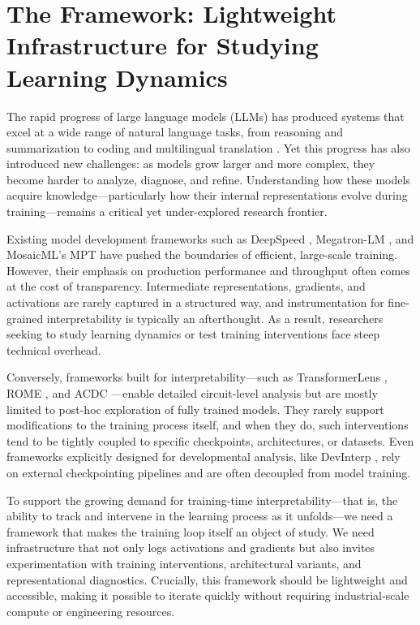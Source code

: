 \chapter{The \picosupabig Framework: Lightweight Infrastructure for Studying Learning Dynamics}
\label{sec:pico-intro}

The rapid progress of large language models (LLMs) has produced systems that excel at a wide range of natural language tasks, from reasoning and summarization to coding and multilingual translation \citep{hendrycks2021mmlu, cobbe2021gsm8k, srivastava2023bigbench}. Yet this progress has also introduced new challenges: as models grow larger and more complex, they become harder to analyze, diagnose, and refine. Understanding how these models acquire knowledge—particularly how their internal representations evolve during training—remains a critical yet under-explored research frontier.

Existing model development frameworks such as DeepSpeed \citep{rasley2020deepspeed}, Megatron-LM \citep{narayanan2021megatron}, and MosaicML’s MPT \citep{mosaic2023mpt} have pushed the boundaries of efficient, large-scale training. However, their emphasis on production performance and throughput often comes at the cost of transparency. Intermediate representations, gradients, and activations are rarely captured in a structured way, and instrumentation for fine-grained interpretability is typically an afterthought. As a result, researchers seeking to study learning dynamics or test training interventions face steep technical overhead.

Conversely, frameworks built for interpretability—such as TransformerLens \citep{nanda2022transformerlens}, ROME \citep{meng2022locating}, and ACDC \citep{conmy2023towards}—enable detailed circuit-level analysis but are mostly limited to post-hoc exploration of fully trained models. They rarely support modifications to the training process itself, and when they do, such interventions tend to be tightly coupled to specific checkpoints, architectures, or datasets. Even frameworks explicitly designed for developmental analysis, like DevInterp \citep{devinterpcode}, rely on external checkpointing pipelines and are often decoupled from model training.

To support the growing demand for training-time interpretability—that is, the ability to track and intervene in the learning process as it unfolds—we need a framework that makes the training loop itself an object of study. We need infrastructure that not only logs activations and gradients but also invites experimentation with training interventions, architectural variants, and representational diagnostics. Crucially, this framework should be lightweight and accessible, making it possible to iterate quickly without requiring industrial-scale compute or engineering resources.

